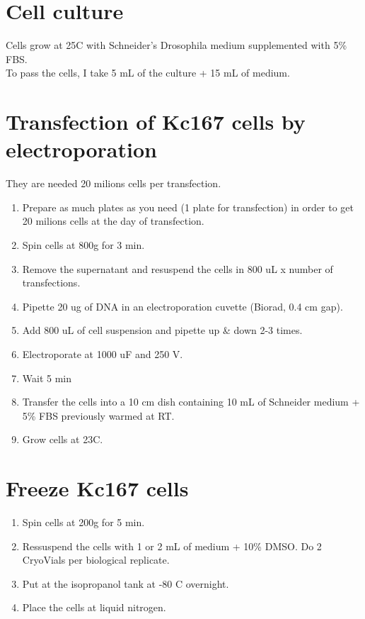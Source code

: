 \documentclass[11pt]{article}
\begin{document}
\section{Cell culture}
\label{sec:orgff5e73c}
Cells grow at 25C with Schneider's Drosophila medium supplemented with 5\% FBS.\\

To pass the cells, I take 5 mL of the culture + 15 mL of medium.\\

\section{Transfection of Kc167 cells by electroporation}
\label{sec:orgcf1c1aa}
They are needed 20 milions cells per transfection.\\
\begin{enumerate}
\item Prepare as much plates as you need (1 plate for transfection) in order to get 20 milions cells at the day of transfection.\\
\item Spin cells at 800g for 3 min.\\
\item Remove the supernatant and resuspend the cells in 800 uL x number of transfections.\\
\item Pipette 20 ug of DNA in an electroporation cuvette (Biorad, 0.4 cm gap).\\
\item Add 800 uL of cell suspension and pipette up \& down 2-3 times.\\
\item Electroporate at 1000 uF and 250 V.\\
\item Wait 5 min\\
\item Transfer the cells into a 10 cm dish containing 10 mL of Schneider medium + 5\% FBS previously warmed at RT.\\
\item Grow cells at 23C.\\
\end{enumerate}

\section{Freeze Kc167 cells}
\label{sec:org50f750f}
\begin{enumerate}
\item Spin cells at 200g for 5 min.\\
\item Ressuspend the cells with 1 or 2 mL of medium + 10\% DMSO. Do 2 CryoVials per biological replicate.\\
\item Put at the isopropanol tank at -80 C overnight.\\
\item Place the cells at liquid nitrogen.\\
\end{enumerate}
\end{document}
